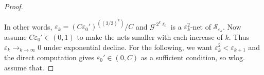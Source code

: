 \documentclass[10pt]{amsart}
\theoremstyle{definition}
\theoremstyle{remark}
\begin{document}
\begin{proof}
\begin{figure}[!hbtp]
        \end{figure}
        In other words, \(\varepsilon_k = (C\varepsilon_0')^{((3/2)^k)}/C\) and \(\mathcal{G}^{\cdot 2^k \ell_0}\) is a \(\varepsilon_k^2\)-net of \(\mathcal{S}_{\varepsilon_k}\). Now assume \(C\varepsilon_0' \in (0, 1)\) to make the nets smaller with each increase of \(k\). Thus \(\varepsilon_k \to_{k \to \infty} 0\) under exponential decline. For the following, we want \(\varepsilon_k^2 < \varepsilon_{k+1}\) and the direct computation gives \(\varepsilon_0' \in (0, C)\) as a sufficient condition, so wlog. assume that.

        \phantom{}
        

\end{proof}
\end{document}
